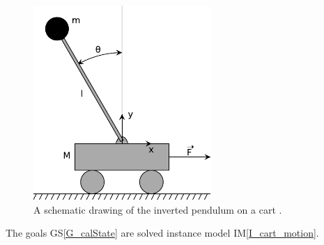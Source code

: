 \documentclass[12pt]{article}
\newcommand{\gsref}[1]{GS\ref{#1}}
\newcommand{\iref}[1]{IM\ref{#1}}
\begin{document}
\begin{figure}[h!]
  \begin{center}
   \includegraphics[width=0.6\textwidth]{Cart-pendulum}
  \caption{A schematic drawing of the inverted pendulum on a cart \cite{wiki_inverted_pendulum_2024}.}
  \label{Fig_InvertedPendulumSchematic} 
  \end{center}
\end{figure}

The goals \gsref{G_calState} are solved instance model \iref{I_cart_motion}.

~\newline

\end{document}
